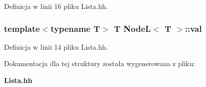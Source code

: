 Definicja w linii 16 pliku Lista.\-hh.

\subsubsection[{val}]{\setlength{\rightskip}{0pt plus 5cm}template$<$typename T$>$ T {\bf Node\-L}$<$ T $>$\-::val}\label{struct_node_l_af8d6352b8a3b463d1a1f2dc9fa6378d6}


Definicja w linii 14 pliku Lista.\-hh.



Dokumentacja dla tej struktury została wygenerowana z pliku\-:\begin{DoxyCompactItemize}
\item 
{\bf Lista.\-hh}\end{DoxyCompactItemize}

